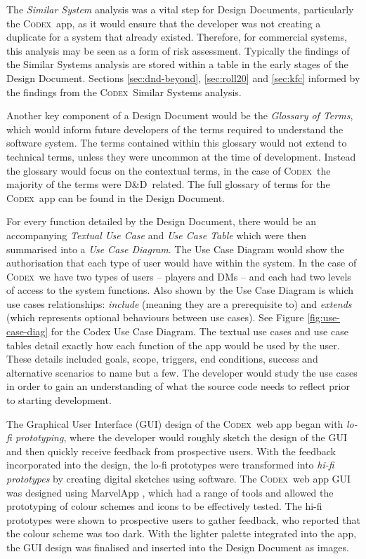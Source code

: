 \documentclass[final]{cmpreport}
\newcommand{\dnd}{D\&D}
\newcommand{\Codex}{\textsc{Codex}}
\begin{document}
		The \emph{Similar System} analysis was a vital step for Design Documents, particularly the \Codex \ app, as it would ensure that the developer was not creating a duplicate for a system that already existed. Therefore, for commercial systems, this analysis may be seen as a form of risk assessment. Typically the findings of the Similar Systems analysis are stored within a table in the early stages of the Design Document. Sections \ref{sec:dnd-beyond}, \ref{sec:roll20} and \ref{sec:kfc} informed by the findings from the \Codex \ Similar Systems analysis. 
		
		Another key component of a Design Document would be the \emph{Glossary of Terms}, which would inform future developers of the terms required to understand the software system. The terms contained within this glossary would not extend to technical terms, unless they were uncommon at the time of development. Instead the glossary would focus on the contextual terms, in the case of \Codex \ the majority of the terms were \dnd \ related. The full glossary of terms for the \Codex \ app can be found in the Design Document.
		
		For every function detailed by the Design Document, there would be an accompanying \emph{Textual Use Case} and \emph{Use Case Table} which were then summarised into a \emph{Use Case Diagram}. The Use Case Diagram would show the authorisation that each type of user would have within the system. In the case of \Codex \ we have two types of users -- players and DMs -- and each had two levels of access to the system functions. Also shown by the Use Case Diagram is which use cases relationships: \emph{include} (meaning they are a prerequisite to) and \emph{extends} (which represents optional behaviours between use cases). See Figure \ref{fig:use-case-diag} for the Codex Use Case Diagram. The textual use cases and use case tables detail exactly how each function of the app would be used by the user. These details included goals, scope, triggers, end conditions, success and alternative scenarios to name but a few. The developer would study the use cases in order to gain an understanding of what the source code needs to reflect prior to starting development.

		The Graphical User Interface (GUI) design of the \Codex \ web app began with \emph{lo-fi prototyping}, where the developer would roughly sketch the design of the GUI and then quickly receive feedback from prospective users. With the feedback incorporated into the design, the lo-fi prototypes were transformed into \emph{hi-fi prototypes} by creating digital sketches using software. The \Codex \ web app GUI was designed using MarvelApp \citep{marvelapp}, which had a range of tools and allowed the prototyping of colour schemes and icons to be effectively tested. The hi-fi prototypes were shown to prospective users to gather feedback, who reported that the colour scheme was too dark. With the lighter palette integrated into the app, the GUI design was finalised and inserted into the Design Document as images. 
		
\end{document}
